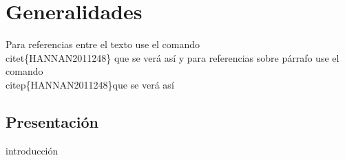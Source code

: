 

\chapter{Generalidades}


Para referencias entre el texto use el comando \\citet\{HANNAN2011248\} que se verá así \citet{HANNAN2011248}   y para referencias sobre párrafo use el comando \\citep\{HANNAN2011248\}que se verá así \citep{DANIEL2016159}

\section{Presentación} %
introducción

